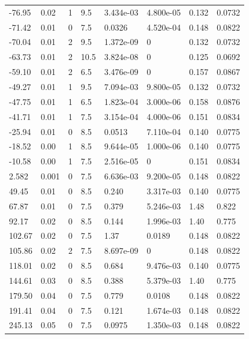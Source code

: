 \documentclass[preview]{standalone}
\begin{document}
{{\begin{tabular}{L{1.2cm}C{1.2cm} C{0.3cm}C{0.5cm} C{1.4cm}C{1.4cm} C{1.4cm}C{1.4cm}}
  -76.95  &  0.02  & 1     & 9.5 &  3.434e-03  & 4.800e-05  & 0.132 &  0.0732   \\ 
  -71.42  &  0.01  & 0     & 7.5 &  0.0326  & 4.520e-04  & 0.148 &  0.0822   \\ 
  -70.04  &  0.01  & 2     & 9.5 &  1.372e-09  & 0  & 0.132 &  0.0732   \\ 
  -63.73  &  0.01  & 2     & 10.5 &  3.824e-08  & 0  & 0.125 &  0.0692   \\ 
  -59.10  &  0.01  & 2     & 6.5 &  3.476e-09  & 0  & 0.157 &  0.0867   \\ 
  -49.27  &  0.01  & 1     & 9.5 &  7.094e-03  & 9.800e-05  & 0.132 &  0.0732   \\ 
  -47.75  &  0.01  & 1     & 6.5 &  1.823e-04  & 3.000e-06  & 0.158 &  0.0876   \\ 
  -41.71  &  0.01  & 1     & 7.5 &  3.154e-04  & 4.000e-06  & 0.151 &  0.0834   \\ 
  -25.94  &  0.01  & 0     & 8.5 &  0.0513  & 7.110e-04  & 0.140 &  0.0775   \\ 
  -18.52  &  0.00  & 1     & 8.5 &  9.644e-05  & 1.000e-06  & 0.140 &  0.0775   \\ 
  -10.58  &  0.00  & 1     & 7.5 &  2.516e-05  & 0  & 0.151 &  0.0834   \\ 
  2.582  &  0.001  & 0     & 7.5 &  6.636e-03  & 9.200e-05  & 0.148 &  0.0822   \\ 
  49.45  &  0.01  & 0     & 8.5 &  0.240  & 3.317e-03  & 0.140 &  0.0775   \\ 
  67.87  &  0.01  & 0     & 7.5 &  0.379  & 5.246e-03  & 1.48 &  0.822   \\ 
  92.17  &  0.02  & 0     & 8.5 &  0.144  & 1.996e-03  & 1.40 &  0.775   \\ 
  102.67  &  0.02  & 0     & 7.5 &  1.37  & 0.0189  & 0.148 &  0.0822   \\ 
  105.86  &  0.02  & 2     & 7.5 &  8.697e-09  & 0  & 0.148 &  0.0822   \\ 
  118.01  &  0.02  & 0     & 8.5 &  0.684  & 9.476e-03  & 0.140 &  0.0775   \\ 
  144.61  &  0.03  & 0     & 8.5 &  0.388  & 5.379e-03  & 1.40 &  0.775   \\ 
  179.50  &  0.04  & 0     & 7.5 &  0.779  & 0.0108  & 0.148 &  0.0822   \\ 
  191.41  &  0.04  & 0     & 7.5 &  0.121  & 1.674e-03  & 0.148 &  0.0822   \\ 
  245.13  &  0.05  & 0     & 7.5 &  0.0975  & 1.350e-03  & 0.148 &  0.0822   \\ 

\end{tabular}}}
\end{document}
